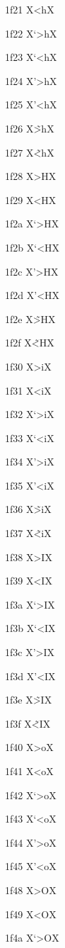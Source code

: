 \documentclass[11pt]{article}
\begin{document}
1f21 X{\textgreek{<h}}X

1f22 X{\textgreek{`>h}}X

1f23 X{\textgreek{`<h}}X

1f24 X{\textgreek{'>h}}X

1f25 X{\textgreek{'<h}}X

1f26 X{\textgreek{\~{>h}}}X

1f27 X{\textgreek{\~{<h}}}X

1f28 X{\textgreek{>H}}X

1f29 X{\textgreek{<H}}X

1f2a X{\textgreek{`>H}}X

1f2b X{\textgreek{`<H}}X

1f2c X{\textgreek{'>H}}X

1f2d X{\textgreek{'<H}}X

1f2e X{\textgreek{\~{>H}}}X

1f2f X{\textgreek{\~{<H}}}X

1f30 X{\textgreek{>i}}X

1f31 X{\textgreek{<i}}X

1f32 X{\textgreek{`>i}}X

1f33 X{\textgreek{`<i}}X

1f34 X{\textgreek{'>i}}X

1f35 X{\textgreek{'<i}}X

1f36 X{\textgreek{\~{>i}}}X

1f37 X{\textgreek{\~{<i}}}X

1f38 X{\textgreek{>I}}X

1f39 X{\textgreek{<I}}X

1f3a X{\textgreek{`>I}}X

1f3b X{\textgreek{`<I}}X

1f3c X{\textgreek{'>I}}X

1f3d X{\textgreek{'<I}}X

1f3e X{\textgreek{\~{>I}}}X

1f3f X{\textgreek{\~{<I}}}X

1f40 X{\textgreek{>o}}X

1f41 X{\textgreek{<o}}X

1f42 X{\textgreek{`>o}}X

1f43 X{\textgreek{`<o}}X

1f44 X{\textgreek{'>o}}X

1f45 X{\textgreek{'<o}}X

1f48 X{\textgreek{>O}}X

1f49 X{\textgreek{<O}}X

1f4a X{\textgreek{`>O}}X
\end{document}
